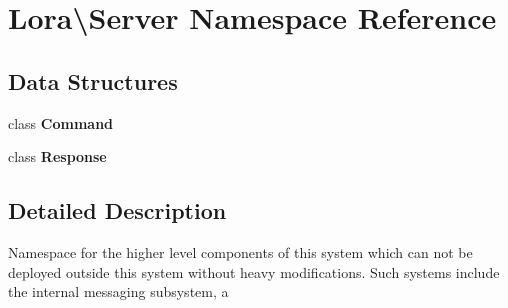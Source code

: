 \section{Lora\textbackslash{}Server Namespace Reference}
\label{namespace_lora_1_1_server}
\subsection*{Data Structures}
\begin{DoxyCompactItemize}
\item 
class \textbf{ Command}
\item 
class \textbf{ Response}
\end{DoxyCompactItemize}


\subsection{Detailed Description}
Namespace for the higher level components of this system which can not be deployed outside this system without heavy modifications. Such systems include the internal messaging subsystem, a 